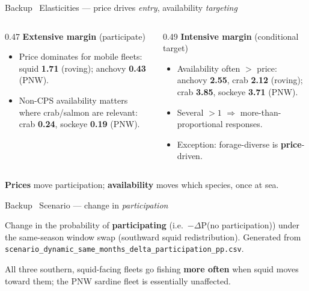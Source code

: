 \documentclass[aspectratio=169,11pt]{beamer}
\newcommand{\takeaway}[1]{\vfill\begin{takeawaybox}\small #1\end{takeawaybox}\vskip2pt}
\newcommand{\scenariolabels}[2]{%
  \ifx#1\empty\else
    \addplot[only marks, mark=none, point meta=explicit symbolic,
             nodes near coords,
             every node near coord/.style={anchor=#2, inner sep=3pt,
               font=\tiny\bfseries, text=black!62}]
      coordinates {#1};
  \fi}
\begin{document}
\begin{frame}{Backup \textbullet\ Elasticities --- price drives \emph{entry}, availability \emph{targeting}}
\begin{columns}[T,onlytextwidth]
\begin{column}{0.47\textwidth}
\textbf{Extensive margin} {\scriptsize(participate)}
\begin{itemize}\small
  \item Price dominates for mobile fleets: squid \textbf{1.71} (roving); anchovy \textbf{0.43} (PNW).
  \item Non-CPS availability matters where crab/salmon are relevant: crab \textbf{0.24}, sockeye \textbf{0.19} (PNW).
\end{itemize}
\end{column}
\hfill
\begin{column}{0.49\textwidth}
\textbf{Intensive margin} {\scriptsize(conditional target)}
\begin{itemize}\small
  \item Availability often $>$ price: anchovy \textbf{2.55}, crab \textbf{2.12} (roving); crab \textbf{3.85}, sockeye \textbf{3.71} (PNW).
  \item Several \textbf{$>1$} $\Rightarrow$ more-than-proportional responses.
  \item Exception: forage-diverse is \textbf{price}-driven.
\end{itemize}
\end{column}
\end{columns}
\takeaway{\textbf{Prices} move participation; \textbf{availability} moves which species, once at sea.}
\end{frame}


\begin{frame}{Backup \textbullet\ Scenario --- change in \emph{participation}}
\centering
\vskip2pt
\vskip2pt
{\scriptsize Change in the probability of \textbf{participating} (i.e.\ $-\Delta$P(no participation))
under the same-season window swap (southward squid redistribution). Generated from
\texttt{scenario\_dynamic\_same\_months\_delta\_participation\_pp.csv}.}
\takeaway{All three southern, squid-facing fleets go fishing \textbf{more often} when squid
moves toward them; the PNW sardine fleet is essentially unaffected.}
\end{frame}
\end{document}
